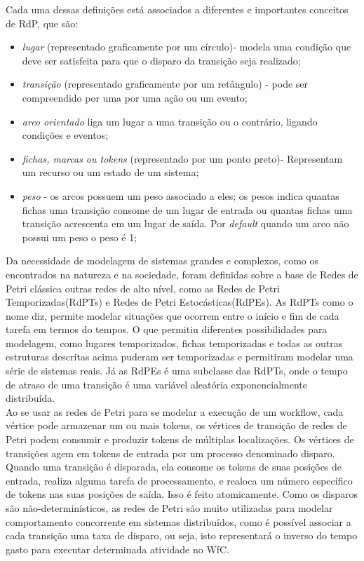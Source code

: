 \documentclass[a4paper,10pt]{article}
\begin{document}
	Cada uma dessas definições está associados a diferentes e importantes conceitos de RdP, que são:
		
		\begin{itemize}
			
			\item \textit{lugar} (representado graficamente por um círculo)- modela uma condição que deve ser satisfeita para que o disparo da transição seja realizado;

			\item \textit{transição} (representado graficamente por um retângulo) - pode ser compreendido por uma por uma ação ou um evento;

			\item \textit{arco orientado} liga um lugar a uma transição ou o contrário, ligando condições e eventos;

			\item \textit{fichas, marcas ou tokens} (representado por um ponto preto)- Representam um recurso ou um estado de um sistema;

			\item \textit{peso} - os arcos possuem um peso associado a eles; os pesos indica quantas fichas uma transição consome de um lugar de entrada ou quantas fichas uma transição acrescenta em um lugar de saída. Por \textit{default} quando um arco não possui um peso o peso é 1;
					
			\end{itemize}
			
	Da necessidade de modelagem de sistemas grandes e complexos, como os encontrados na natureza e na sociedade, foram definidas sobre a base de Redes de Petri clássica outras redes de alto nível, como as Redes de Petri Temporizadas(RdPTs) e Redes de Petri Estocásticas(RdPEs). As RdPTs como o nome diz, permite modelar situações que ocorrem entre o início e fim de cada tarefa em termos do tempos. O que permitiu diferentes possibilidades para modelagem, como lugares temporizados, fichas temporizadas e todas as outras estruturas descritas acima puderam ser temporizadas e permitiram modelar uma série de sistemas reais. Já as RdPEs é uma subclasse das RdPTs, onde o tempo de atraso de uma transição é uma variável aleatória exponencialmente distribuída\cite{Braghetto2011}. \\
		
	Ao se usar as redes de Petri para se modelar a execução de um workflow, cada vértice pode armazenar um ou mais tokens, os vértices de transição de redes de Petri podem consumir e produzir tokens de múltiplas localizações. Os vértices de transições agem em tokens de entrada por um processo denominado disparo. Quando uma transição é disparada, ela consome os tokens de suas posições de entrada, realiza alguma tarefa de processamento, e realoca um número específico de tokens nas suas posições de saída. Isso é feito atomicamente. Como os disparos são não-determinísticos, as redes de Petri são muito utilizadas para modelar comportamento concorrente em sistemas distribuídos\cite{Ogasawara2011}, como é possível associar a cada transição uma taxa de disparo, ou seja, isto representará o inverso do tempo gasto para executar determinada atividade no WfC.\\
	
\end{document}
